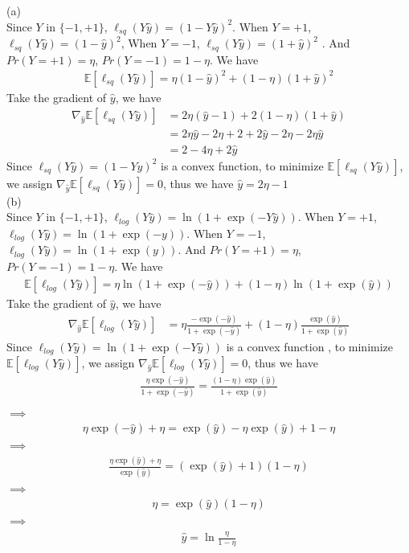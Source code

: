 \documentclass[twoside,11pt]{homework}
\begin{document}
(a) \\
Since $Y$ in $\{-1, +1\}$, $\ell_{sq} (Y \hat y) = (1 - Y\hat y) ^ 2$.
When $Y = +1$, $\ell_{sq}(Y\hat y) = (1- \hat y)^2$, 
When $Y = -1$, $\ell_{sq}(Y \hat y) = (1+ \hat y)^2$ .
And $Pr(Y = +1) = \eta$, $Pr(Y= -1) = 1 - \eta $. We have 
\begin{align*}
\mathbb{E}[\ell_{sq} (Y \hat y)] = \eta(1-\hat y)^2 + (1-\eta) (1+ \hat y)^2
\end{align*}
Take the gradient of $\hat y$, we have \\
\begin{align*}
\nabla _ {\hat y} \mathbb{E}[\ell_{sq} (Y \hat y)] &= 2\eta (\hat y -1) + 2(1- \eta) (1+ \hat y) \\
& = 2\eta \hat y - 2\eta +2 +2\hat y - 2\eta - 2\eta \hat y \\
& = 2 - 4\eta + 2\hat y
\end{align*}
Since $\ell_{sq} (Y \hat y) = (1 - Y\hat y) ^ 2$ is a convex function, to minimize $\mathbb{E}[\ell_{sq} (Y \hat y)]$, we assign $\nabla _ {\hat y} \mathbb{E}[\ell_{sq} (Y \hat y)] = 0$, thus we have 
$\hat y= 2\eta -1 $ \\




(b) \\
Since $Y$ in $\{-1, +1\}$, $\ell_{log}(Y \hat y) = \ln (1 + \exp (-Y\hat y))$.
When $Y = +1$, $\ell_{log}(Y\hat y) =  \ln (1 + \exp (-y))$.
When $Y = -1$, $\ell_{log}(Y \hat y) = \ln (1 + \exp (y))$.
And $Pr(Y = +1) = \eta$, $Pr(Y= -1) = 1 - \eta $. We have 
\begin{align*}
\mathbb{E}[\ell_{log} (Y \hat y)] = \eta \ln (1 + \exp (-\hat y)) + (1-\eta) \ln(1 + \exp (\hat y))
\end{align*}
Take the gradient of $\hat y$, we have \\
\begin{align*}
\nabla _ {\hat y} \mathbb{E}[\ell_{log} (Y \hat y)]  &= \eta \frac {-\exp(-\hat y)}{1+\exp(-\hat y)} + (1 - \eta) \frac {\exp({\hat y})}{1 + \exp ({\hat y})}
\end{align*}
Since $\ell_{log}(Y \hat y) = \ln (1 + \exp (-Y\hat y))$ is a convex function , to minimize $\mathbb{E}[\ell_{log} (Y \hat y)]$, we assign $\nabla _ {\hat y} \mathbb{E}[\ell_{log} (Y \hat y)] = 0$, thus we have
\begin{align*}
 \frac {\eta \exp(-\hat y)}{1+\exp(-\hat y)} = \frac {(1 - \eta)\exp({\hat y})}{1 + \exp ({\hat y})} \\
 \end{align*}
 $\implies$ 
 \begin{align*}
\eta \exp(-\hat y) + \eta = \exp (\hat y) - \eta \exp(\hat y) + 1 - \eta
 \end{align*}
  $\implies$ 
\begin{align*}
\frac{\eta \exp(\hat y) + \eta}{\exp (\hat y)} = (\exp(\hat y) + 1)(1 - \eta)
\end{align*}
 $\implies$ 
\begin{align*}
\eta = \exp(\hat y) (1- \eta)
\end{align*}
 $\implies$ 
\begin{align*}
\hat y = \ln \frac{\eta}{1 - \eta}
\end{align*}
\end{document}
